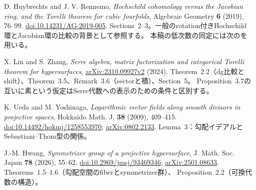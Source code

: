 D. Huybrechts and J. V. Rennemo,
\emph{Hochschild cohomology versus the Jacobian ring, and the Torelli theorem for cubic fourfolds},
Algebraic Geometry \textbf{6} (2019), 76--99.
\href{https://doi.org/10.14231/AG-2019-005}{doi:10.14231/AG-2019-005}.
Sections~2--3。一般のrotation付きHochschild環とJacobian環の比較の背景として参照する。
本稿の低次数の同定には次の\cite{LZ}を用いる。

X. Lin and S. Zhang,
\emph{Serre algebra, matrix factorization and categorical Torelli theorem for hypersurfaces},
\href{https://arxiv.org/abs/2310.09927v2}{arXiv:2310.09927v2} (2024).
Theorem~2.2（dg比較とshift）、Theorem~3.5、Remark~3.6（sectorと積）、Section~5。
Proposition~3.7の互いに素という仮定はSerre代数への表示のための条件と区別する。

K. Ueda and M. Yoshinaga,
\emph{Logarithmic vector fields along smooth divisors in projective spaces},
Hokkaido Math. J. \textbf{38} (2009), 409--415.
\href{https://doi.org/10.14492/hokmj/1258553970}{doi:10.14492/hokmj/1258553970};
\href{https://arxiv.org/abs/0802.2133}{arXiv:0802.2133}.
Lemma~3：勾配イデアルとSebastiani--Thom型の関係。

J.-M. Hwang,
\emph{Symmetrizer group of a projective hypersurface},
J. Math. Soc. Japan \textbf{78} (2026), 55--62.
\href{https://doi.org/10.2969/jmsj/93469346}{doi:10.2969/jmsj/93469346};
\href{https://arxiv.org/abs/2501.08633}{arXiv:2501.08633}.
Theorems~1.5--1.6（勾配空間のfiberとsymmetrizer群）、
Proposition~2.2（可換代数の構造）。
